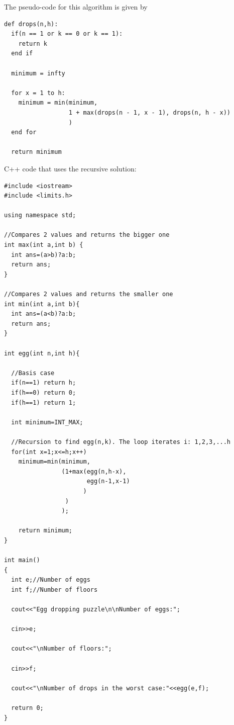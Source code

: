 The pseudo-code for this algorithm is given by
\begin{lstlisting}[style=pseudostyle]
def drops(n,h):
  if(n == 1 or k == 0 or k == 1):
    return k
  end if

  minimum = infty

  for x = 1 to h:
    minimum = min(minimum, 
                  1 + max(drops(n - 1, x - 1), drops(n, h - x))
                  )
  end for

  return minimum
\end{lstlisting}
C++ code that uses the recursive solution:
\begin{lstlisting}[style=raycppnewsnippet]
#include <iostream>
#include <limits.h>

using namespace std;

//Compares 2 values and returns the bigger one
int max(int a,int b) {
  int ans=(a>b)?a:b;
  return ans;
}

//Compares 2 values and returns the smaller one
int min(int a,int b){
  int ans=(a<b)?a:b;
  return ans;
}

int egg(int n,int h){

  //Basis case
  if(n==1) return h;
  if(h==0) return 0;
  if(h==1) return 1;

  int minimum=INT_MAX;

  //Recursion to find egg(n,k). The loop iterates i: 1,2,3,...h
  for(int x=1;x<=h;x++) 
    minimum=min(minimum,
                (1+max(egg(n,h-x),
                       egg(n-1,x-1)
                      )
                 )
                );

    return minimum;
}

int main()
{
  int e;//Number of eggs
  int f;//Number of floors

  cout<<"Egg dropping puzzle\n\nNumber of eggs:";

  cin>>e;

  cout<<"\nNumber of floors:";

  cin>>f;

  cout<<"\nNumber of drops in the worst case:"<<egg(e,f);

  return 0;
}
\end{lstlisting}

\qasepline{}

